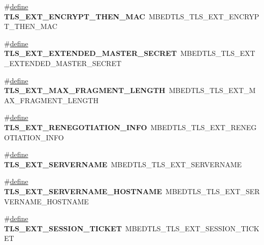 \begin{DoxyCompactItemize}
\#\hyperlink{structdefine}{define} {\bfseries T\+L\+S\+\_\+\+E\+X\+T\+\_\+\+E\+N\+C\+R\+Y\+P\+T\+\_\+\+T\+H\+E\+N\+\_\+\+M\+AC}~M\+B\+E\+D\+T\+L\+S\+\_\+\+T\+L\+S\+\_\+\+E\+X\+T\+\_\+\+E\+N\+C\+R\+Y\+P\+T\+\_\+\+T\+H\+E\+N\+\_\+\+M\+AC
\item 
\mbox{\label{compat-1_83_8h_ac9dee2d05752c1b5385cabd27bd0beb4}} 
\#\hyperlink{structdefine}{define} {\bfseries T\+L\+S\+\_\+\+E\+X\+T\+\_\+\+E\+X\+T\+E\+N\+D\+E\+D\+\_\+\+M\+A\+S\+T\+E\+R\+\_\+\+S\+E\+C\+R\+ET}~M\+B\+E\+D\+T\+L\+S\+\_\+\+T\+L\+S\+\_\+\+E\+X\+T\+\_\+\+E\+X\+T\+E\+N\+D\+E\+D\+\_\+\+M\+A\+S\+T\+E\+R\+\_\+\+S\+E\+C\+R\+ET
\item 
\mbox{\label{compat-1_83_8h_aa7408a3622ebe264a5ef2c105a964cbd}} 
\#\hyperlink{structdefine}{define} {\bfseries T\+L\+S\+\_\+\+E\+X\+T\+\_\+\+M\+A\+X\+\_\+\+F\+R\+A\+G\+M\+E\+N\+T\+\_\+\+L\+E\+N\+G\+TH}~M\+B\+E\+D\+T\+L\+S\+\_\+\+T\+L\+S\+\_\+\+E\+X\+T\+\_\+\+M\+A\+X\+\_\+\+F\+R\+A\+G\+M\+E\+N\+T\+\_\+\+L\+E\+N\+G\+TH
\item 
\mbox{\label{compat-1_83_8h_ad0fbdb0804151f3a00631c342cf65957}} 
\#\hyperlink{structdefine}{define} {\bfseries T\+L\+S\+\_\+\+E\+X\+T\+\_\+\+R\+E\+N\+E\+G\+O\+T\+I\+A\+T\+I\+O\+N\+\_\+\+I\+N\+FO}~M\+B\+E\+D\+T\+L\+S\+\_\+\+T\+L\+S\+\_\+\+E\+X\+T\+\_\+\+R\+E\+N\+E\+G\+O\+T\+I\+A\+T\+I\+O\+N\+\_\+\+I\+N\+FO
\item 
\mbox{\label{compat-1_83_8h_a21bb5a4f093a191a4e3f0efae924dd7c}} 
\#\hyperlink{structdefine}{define} {\bfseries T\+L\+S\+\_\+\+E\+X\+T\+\_\+\+S\+E\+R\+V\+E\+R\+N\+A\+ME}~M\+B\+E\+D\+T\+L\+S\+\_\+\+T\+L\+S\+\_\+\+E\+X\+T\+\_\+\+S\+E\+R\+V\+E\+R\+N\+A\+ME
\item 
\mbox{\label{compat-1_83_8h_a948d249c0b07844056fdf68c640bb2ca}} 
\#\hyperlink{structdefine}{define} {\bfseries T\+L\+S\+\_\+\+E\+X\+T\+\_\+\+S\+E\+R\+V\+E\+R\+N\+A\+M\+E\+\_\+\+H\+O\+S\+T\+N\+A\+ME}~M\+B\+E\+D\+T\+L\+S\+\_\+\+T\+L\+S\+\_\+\+E\+X\+T\+\_\+\+S\+E\+R\+V\+E\+R\+N\+A\+M\+E\+\_\+\+H\+O\+S\+T\+N\+A\+ME
\item 
\mbox{\label{compat-1_83_8h_aef2d649998ef071cfa04c072ebd30909}} 
\#\hyperlink{structdefine}{define} {\bfseries T\+L\+S\+\_\+\+E\+X\+T\+\_\+\+S\+E\+S\+S\+I\+O\+N\+\_\+\+T\+I\+C\+K\+ET}~M\+B\+E\+D\+T\+L\+S\+\_\+\+T\+L\+S\+\_\+\+E\+X\+T\+\_\+\+S\+E\+S\+S\+I\+O\+N\+\_\+\+T\+I\+C\+K\+ET

\end{DoxyCompactItemize}
